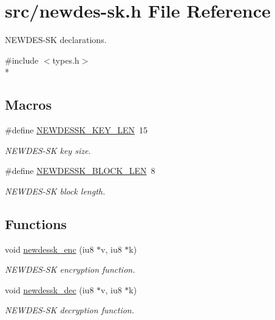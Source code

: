 \hypertarget{newdes-sk_8h}{\section{src/newdes-\/sk.h File Reference}
\label{newdes-sk_8h}
}


N\-E\-W\-D\-E\-S-\/\-S\-K declarations.  


{\ttfamily \#include $<$types.\-h$>$}\\*
\subsection*{Macros}
\begin{DoxyCompactItemize}
\item 
\hypertarget{newdes-sk_8h_ac00ffa9196b77a8b42a544de3258e53e}{\#define \hyperlink{newdes-sk_8h_ac00ffa9196b77a8b42a544de3258e53e}{N\-E\-W\-D\-E\-S\-S\-K\-\_\-\-K\-E\-Y\-\_\-\-L\-E\-N}~15}\label{newdes-sk_8h_ac00ffa9196b77a8b42a544de3258e53e}

\begin{DoxyCompactList}\small\item\em N\-E\-W\-D\-E\-S-\/\-S\-K key size. \end{DoxyCompactList}\item 
\hypertarget{newdes-sk_8h_a78ce1251bba5aa2cb5a9bae51b3c068c}{\#define \hyperlink{newdes-sk_8h_a78ce1251bba5aa2cb5a9bae51b3c068c}{N\-E\-W\-D\-E\-S\-S\-K\-\_\-\-B\-L\-O\-C\-K\-\_\-\-L\-E\-N}~8}\label{newdes-sk_8h_a78ce1251bba5aa2cb5a9bae51b3c068c}

\begin{DoxyCompactList}\small\item\em N\-E\-W\-D\-E\-S-\/\-S\-K block length. \end{DoxyCompactList}\end{DoxyCompactItemize}
\subsection*{Functions}
\begin{DoxyCompactItemize}
\item 
void \hyperlink{newdes-sk_8h_a314c77c87cefb8e6645e28ef96d95e78}{newdessk\-\_\-enc} (iu8 $\ast$v, iu8 $\ast$k)
\begin{DoxyCompactList}\small\item\em N\-E\-W\-D\-E\-S-\/\-S\-K encryption function. \end{DoxyCompactList}\item 
void \hyperlink{newdes-sk_8h_a8d52f79081a3b4d520b0e21ecf24d397}{newdessk\-\_\-dec} (iu8 $\ast$v, iu8 $\ast$k)
\begin{DoxyCompactList}\small\item\em N\-E\-W\-D\-E\-S-\/\-S\-K decryption function. \end{DoxyCompactList}\end{DoxyCompactItemize}


